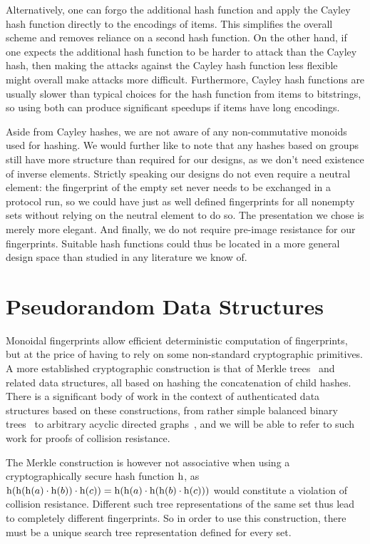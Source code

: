 Alternatively, one can forgo the additional hash function and apply the Cayley hash function directly to the encodings of items. This simplifies the overall scheme and removes reliance on a second hash function. On the other hand, if one expects the additional hash function to be harder to attack than the Cayley hash, then making the attacks against the Cayley hash function less flexible might overall make attacks more difficult. Furthermore, Cayley hash functions are usually slower than typical choices for the hash function from items to bitstrings, so using both can produce significant speedups if items have long encodings.

Aside from Cayley hashes, we are not aware of any non-commutative monoids used for hashing. We would further like to note that any hashes based on groups still have more structure than required for our designs, as we don't need existence of inverse elements. Strictly speaking our designs do not even require a neutral element: the fingerprint of the empty set never needs to be exchanged in a protocol run, so we could have just as well defined fingerprints for all nonempty sets without relying on the neutral element to do so. The presentation we chose is merely more elegant. And finally, we do not require pre-image resistance for our fingerprints. Suitable hash functions could thus be located in a more general design space than studied in any literature we know of.

\section{Pseudorandom Data Structures}
\label{randomization}

Monoidal fingerprints allow efficient deterministic computation of fingerprints, but at the price of having to rely on some non-standard cryptographic primitives. A more established cryptographic construction is that of Merkle trees~\cite{merkle1989certified} and related data structures, all based on hashing the concatenation of child hashes. There is a significant body of work in the context of authenticated data structures based on these constructions, from rather simple balanced binary trees~\cite{naor2000certificate} to arbitrary acyclic directed graphs~\cite{martel2004general}, and we will be able to refer to such work for proofs of collision resistance.

The Merkle construction is however not associative when using a cryptographically secure hash function $\operatorname{h}$, as $\operatorname{h}(\operatorname{h}(\operatorname{h}(a) \cdot \operatorname{h}(b)) \cdot \operatorname{h}(c)) = \operatorname{h}(\operatorname{h}(a) \cdot \operatorname{h}(\operatorname{h}(b) \cdot \operatorname{h}(c)))$ would constitute a violation of collision resistance. Different such tree representations of the same set thus lead to completely different fingerprints. So in order to use this construction, there must be a unique search tree representation defined for every set.

